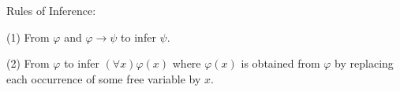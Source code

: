 Rules of Inference:

(1) From $\varphi$ and $\varphi \rightarrow \psi$ to infer $\psi$.

(2) From $\varphi$ to infer $(\forall x)\varphi(x)$ where $\varphi(x)$ is obtained from $\varphi$ by replacing each occurrence of some free variable by $x$.
